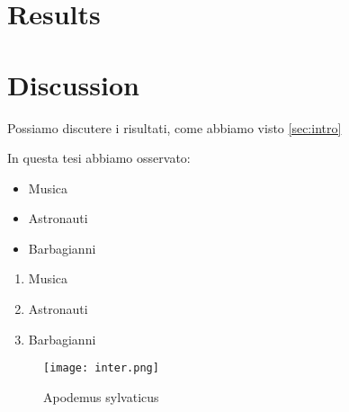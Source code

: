 \documentclass[12pt]{article}
\begin{document}
\section{Results}

\section{Discussion}
Possiamo discutere i risultati, come abbiamo visto \ref{sec:intro} %


In questa tesi abbiamo osservato:
\begin{itemize}
    \item Musica
    \item Astronauti
    \item Barbagianni
\end{itemize} %

\begin{enumerate} 
    \item Musica
    \item Astronauti
    \item Barbagianni
\end{enumerate}

\newpage %

\begin{figure}
    \centering %
    \texttt{[image: inter.png]} %
    \caption{Apodemus sylvaticus} %
    
\label{fig:apodemus} 
\end{figure}

\newpage %
\end{document}
